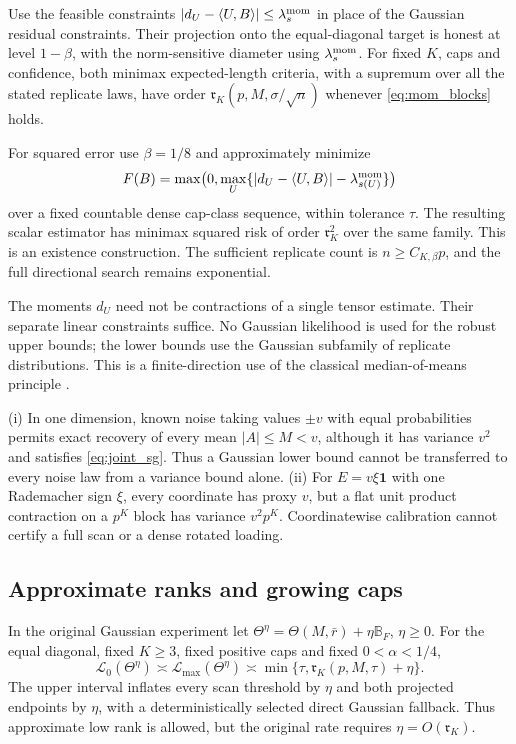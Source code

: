 \begin{theorem}\label{thm:mom_full}
Use the feasible constraints
$|d_U-\langle U,B\rangle|\le\lambda_s^{\rm mom}$ in place of the Gaussian residual constraints. Their projection onto the equal-diagonal target is honest at level $1-\beta$, with the norm-sensitive diameter using $\lambda_s^{\rm mom}$. For fixed $K$, caps and confidence, both minimax expected-length criteria, with a supremum over all the stated replicate laws, have order $\mathfrak r_K(p,M,\sigma/\sqrt n)$ whenever \eqref{eq:mom_blocks} holds.

For squared error use $\beta=1/8$ and approximately minimize
\[
 F(B)=\max\bigl(0,\max_U\{|d_U-\langle U,B\rangle|-\lambda_{s(U)}^{\rm mom}\}\bigr)
\]
over a fixed countable dense cap-class sequence, within tolerance $\tau$. The resulting scalar estimator has minimax squared risk of order $\mathfrak r_K^2$ over the same family. This is an existence construction. The sufficient replicate count is $n\ge C_{K,\beta}p$, and the full directional search remains exponential.
\end{theorem}

The moments $d_U$ need not be contractions of a single tensor estimate. Their separate linear constraints suffice. No Gaussian likelihood is used for the robust upper bounds; the lower bounds use the Gaussian subfamily of replicate distributions. This is a finite-direction use of the classical median-of-means principle \citep{devroye2016}.

\begin{proposition}\label{prop:noise_limits}
(i) In one dimension, known noise taking values $\pm v$ with equal probabilities permits exact recovery of every mean $|A|\le M<v$, although it has variance $v^2$ and satisfies \eqref{eq:joint_sg}. Thus a Gaussian lower bound cannot be transferred to every noise law from a variance bound alone.
(ii) For $E=v\xi\mathbf1$ with one Rademacher sign $\xi$, every coordinate has proxy $v$, but a flat unit product contraction on a $p^K$ block has variance $v^2p^K$. Coordinatewise calibration cannot certify a full scan or a dense rotated loading.
\end{proposition}

\subsection{Approximate ranks and growing caps}

\begin{theorem}\label{thm:approx_sharp}
In the original Gaussian experiment let
$\Theta^\eta=\Theta(M,\bar r)+\eta\mathbb B_F$, $\eta\ge0$. For the equal diagonal, fixed $K\ge3$, fixed positive caps and fixed $0<\alpha<1/4$,
\[
 \mathcal L_0(\Theta^\eta)\asymp\mathcal L_{\max}(\Theta^\eta)
 \asymp \min\{\tau,\mathfrak r_K(p,M,\tau)+\eta\}.
\]
The upper interval inflates every scan threshold by $\eta$ and both projected endpoints by $\eta$, with a deterministically selected direct Gaussian fallback. Thus approximate low rank is allowed, but the original rate requires $\eta=O(\mathfrak r_K)$.
\end{theorem}

